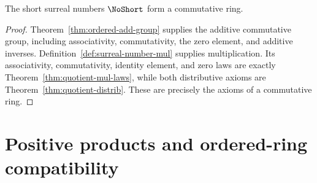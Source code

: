 \begin{theorem}
  \label{thm:comm-ring}
  \leanok
  The short surreal numbers \(\NoShort\) form a commutative ring.
\end{theorem}
\begin{proof}
  \leanok
  Theorem~\ref{thm:ordered-add-group} supplies the additive commutative group,
  including associativity, commutativity, the zero element, and additive
  inverses.  Definition~\ref{def:surreal-number-mul} supplies multiplication.
  Its associativity, commutativity, identity element, and zero laws are exactly
  Theorem~\ref{thm:quotient-mul-laws}, while both distributive axioms are
  Theorem~\ref{thm:quotient-distrib}.  These are precisely the axioms of a
  commutative ring.
\end{proof}

\section{Positive products and ordered-ring compatibility}

